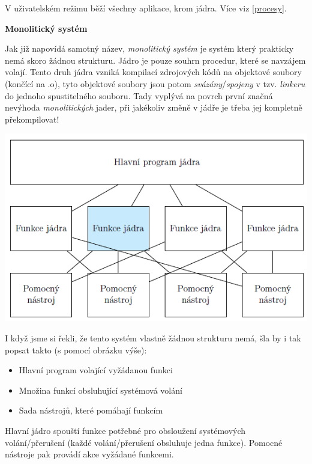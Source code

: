 V uživatelském režimu běží všechny aplikace, krom jádra. Více viz \ref{procesy}.

\begin{Large}
    \vspace{0,5cm} 
    \textbf{Monolitický systém}\\
\end{Large}

Jak již napovídá samotný název, \textit{monolitický systém} je systém který prakticky nemá skoro žádnou strukturu. Jádro je pouze souhrn procedur, které se navzájem volají. Tento druh jádra vzniká kompilací zdrojových kódů na objektové soubory (končící na .o), tyto objektové soubory jsou potom \textit{svázány}/\textit{spojeny} v tzv. \textit{linkeru} do jednoho spustitelného souboru. Tady vyplývá na povrch první značná nevýhoda \textit{monolitických} jader, při jakékoliv změně v jádře je třeba jej kompletně překompilovat! 

\begin{center}
    \includegraphics[scale=1]{BPC-SOS/images/OS_mono_kernel.png}
\end{center}

I když jsme si řekli, že tento systém vlastně žádnou strukturu nemá, šla by i tak popsat takto (s pomocí obrázku výše):

\begin{itemize}
    \item Hlavní program volající vyžádanou funkci
    \item Množina funkcí obsluhující systémová volání
    \item Sada nástrojů, které pomáhají funkcím
\end{itemize}

Hlavní jádro spouští funkce potřebné pro obsloužení systémových volání/přerušení (každé volání/přerušení obsluhuje jedna funkce). Pomocné nástroje pak provádí akce vyžádané funkcemi. 

